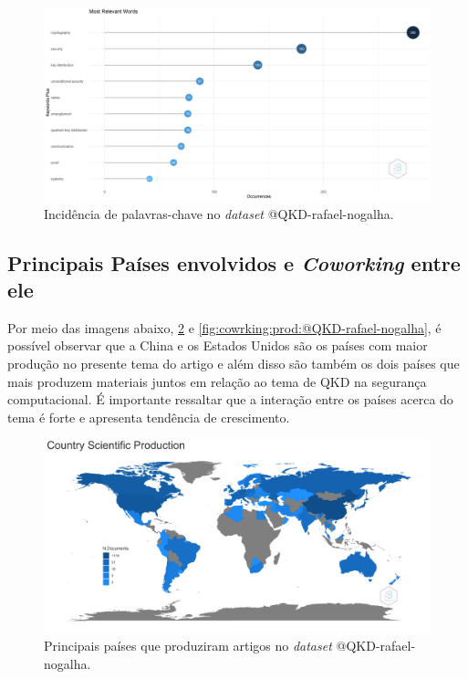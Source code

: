 \begin{figure}[H]
    \centering
    \includegraphics[width=1\textwidth]{experiments/rafaelnogalha/PesquisaBibliografica/QKDSegurancaComputacional/images/palavras_relevantes.png}
    \caption{Incidência de palavras-chave no \textit{dataset} @QKD-rafael-nogalha.}
    \label{fig:campos:plot:@QKD-rafael-nogalha}
\end{figure}



\subsection{Principais Países envolvidos e \textit{Coworking} entre ele}

Por meio das imagens abaixo, \ref{fig:map:prod:@QKD-rafael-nogalha} e \ref{fig:cowrking:prod:@QKD-rafael-nogalha}, é possível observar que a China e os Estados Unidos são os países com maior produção no presente tema do artigo e além disso são também os dois países que mais produzem materiais juntos em relação ao tema de QKD na segurança computacional. É importante ressaltar que a interação entre os países acerca do tema é forte e apresenta tendência de crescimento.

\begin{figure}[H]
    \centering
    \includegraphics[width=1\textwidth]{experiments/rafaelnogalha/PesquisaBibliografica/QKDSegurancaComputacional/images/especificacao_paises_producao.png}
    \caption{Principais países que produziram artigos no \textit{dataset} @QKD-rafael-nogalha.}
    \label{fig:map:prod:@QKD-rafael-nogalha}
\end{figure}

